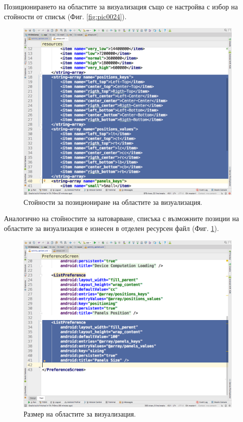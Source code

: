 \documentclass[book,14pt,oneside,openany]{memoir}
\begin{document}
Позиционирането на областите за визуализация също се настройва с избор на стойности от списък (Фиг. \ref{fig:pic0024}). 

\begin{figure}[h]
  \centering
  \includegraphics[height=0.45\pdfpageheight]{pic0025}
  \caption{Стойности за позициониране на областите за визуализация.}
\label{fig:pic0025}
\end{figure}
\FloatBarrier

Аналогично на стойностите за натоварване, списъка с възможните позиции на областите за визуализация е изнесен в отделен ресурсен файл (Фиг. \ref{fig:pic0025}). 

\begin{figure}[h]
  \centering
  \includegraphics[height=0.45\pdfpageheight]{pic0026}
  \caption{Размер на областите за визуализация.}
\label{fig:pic0026}
\end{figure}
\FloatBarrier
\end{document}
